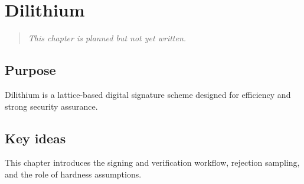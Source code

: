 \chapter{Dilithium}

\begin{quote}
\textit{This chapter is planned but not yet written.}
\end{quote}

\section{Purpose}
Dilithium is a lattice-based digital signature scheme designed for efficiency and strong security assurance.
\section{Key ideas}
This chapter introduces the signing and verification workflow, rejection sampling, and the role of hardness assumptions.
